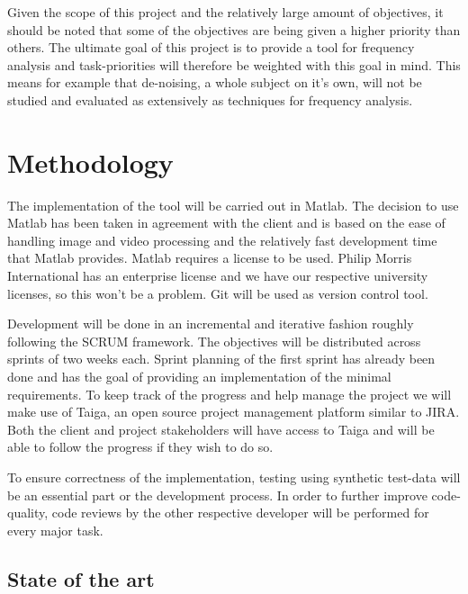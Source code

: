 \documentclass[11pt]{scrartcl}
\begin{document}
Given the scope of this project and the relatively large amount of objectives, it should be noted that some of the objectives are being given a higher priority than others. The ultimate goal of this project is to provide a tool for frequency analysis and task-priorities will therefore be weighted with this goal in mind. This means for example that de-noising, a whole subject on it’s own, will not be studied and evaluated as extensively as techniques for frequency analysis. 

 

\section{Methodology}

The implementation of the tool will be carried out in Matlab. The decision to use Matlab has been taken in agreement with the client and is based on the ease of handling image and video processing and the relatively fast development time that Matlab provides.  Matlab requires a license to be used. Philip Morris International has an enterprise license and we have our respective university licenses, so this won’t be a problem. Git will be used as version control tool.

Development will be done in an incremental and iterative fashion roughly following the SCRUM framework. The objectives will be distributed across sprints of two weeks each. Sprint planning of the first sprint has already been done and has the goal of providing an implementation of the minimal requirements. To keep track of the progress and help manage the project we will make use of Taiga, an open source project management platform similar to JIRA. Both the client and project stakeholders will have access to Taiga and will be able to follow the progress if they wish to do so. 

To ensure correctness of the implementation, testing using synthetic test-data will be an essential part or the development process. In order to further improve code-quality, code reviews by the other respective developer will be performed for every major task.

\subsection{State of the art}
\end{document}
